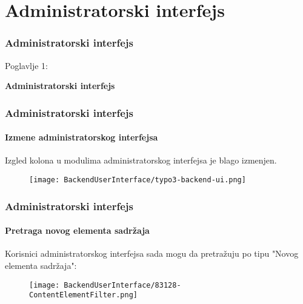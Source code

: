 %

\section{Administratorski interfejs}
\begin{frame}[fragile]
	\frametitle{Administratorski interfejs}

	\begin{center}\huge{Poglavlje 1:}\end{center}
	\begin{center}\huge{\color{typo3darkgrey}\textbf{Administratorski interfejs}}\end{center}

\end{frame}


\begin{frame}[fragile]
	\frametitle{Administratorski interfejs}
	\framesubtitle{Izmene administratorskog interfejsa}

	Izgled kolona u modulima administratorskog interfejsa je blago izmenjen.

	\begin{figure}
		\texttt{[image: BackendUserInterface/typo3-backend-ui.png]}
	\end{figure}

\end{frame}


\begin{frame}[fragile]
	\frametitle{Administratorski interfejs}
	\framesubtitle{Pretraga novog elementa sadržaja}

	Korisnici administratorskog interfejsa sada mogu da pretražuju po tipu "Novog elementa sadržaja":

	\begin{figure}
		\texttt{[image: BackendUserInterface/83128-ContentElementFilter.png]}
	\end{figure}

\end{frame}

